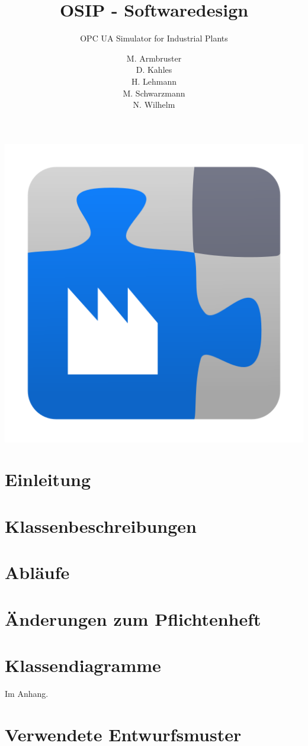 \documentclass[parskip=full]{scrartcl}
\title{OSIP - Softwaredesign}
\subtitle{OPC UA Simulator for Industrial Plants}
\author{
    M. Armbruster\\
    D. Kahles\\
    H. Lehmann\\
    M. Schwarzmann\\
    N. Wilhelm
}
\begin{document}
\maketitle

\vspace{20px}
\begin{center}
  \includegraphics[scale=0.4]{../icon.png}
\end{center}
\pagebreak
\tableofcontents
\pagebreak

\section{Einleitung}

\section{Klassenbeschreibungen}

\section{Abläufe}

\section{Änderungen zum Pflichtenheft}
%

\section{Klassendiagramme}
Im Anhang.

\section{Verwendete Entwurfsmuster}
\end{document}

